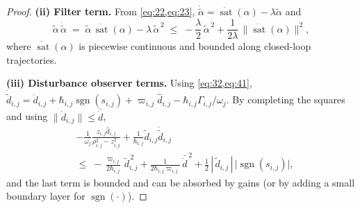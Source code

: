 \documentclass[pdflatex,sn-mathphys-num]{sn-jnl}%
\theoremstyle{thmstyleone}%
\theoremstyle{thmstyletwo}%
\theoremstyle{thmstylethree}%
\begin{document}
\begin{proof}
\textbf{(ii) Filter term.} From \cref{eq:22,eq:23}, $\dot{\tilde\alpha}=\dot{\operatorname{sat}}(\alpha)-\lambda\tilde\alpha$ and
\begin{equation}\label{eq:48}
  \tilde\alpha\,\dot{\tilde\alpha}
  \;=\; \tilde\alpha\,\dot{\operatorname{sat}}(\alpha)-\lambda\,\tilde\alpha^{\,2}
  \;\le\; -\frac{\lambda}{2}\,\tilde\alpha^{\,2}+\frac{1}{2\lambda}\,\|\dot{\operatorname{sat}}(\alpha)\|^{2},
\end{equation}
where $\dot{\operatorname{sat}}(\alpha)$ is piecewise continuous and bounded along closed-loop trajectories.

\textbf{(iii) Disturbance observer terms.} Using \cref{eq:32,eq:41},
$\dot{\tilde d}_{i,j}=\dot d_{i,j}+\hbar_{i,j}\operatorname{sgn}(s_{i,j})+\varpi_{i,j}\hat d_{i,j}-\hbar_{i,j}\Gamma_{i,j}/\omega_j$.
By completing the squares and using $\|\dot d_{i,j}\|\le\bar{\dot d}$,
\begin{equation}\label{eq:dist}
\begin{aligned}
  &-\frac{1}{\omega_{j}}\frac{z_{i,j}\hat d_{i,j}}{\rho_{i,j}^2-z_{i,j}^2}
   +\frac{1}{\hbar_{i,j}}\tilde d_{i,j}\dot{\tilde d}_{i,j} \\
  &\le\; -\frac{\varpi_{i,j}}{2\hbar_{i,j}}\,\tilde d_{i,j}^{\,2}
          +\frac{1}{2\hbar_{i,j}\varpi_{i,j}}\,\bar{\dot d}^{\,2}
          +\frac{1}{2}\,|\,\tilde d_{i,j}\,|\,\big|\operatorname{sgn}(s_{i,j})\big| ,
\end{aligned}
\end{equation}
and the last term is bounded and can be absorbed by gains (or by adding a small boundary layer for $\operatorname{sgn}(\cdot)$).


\end{proof}
\end{document}
